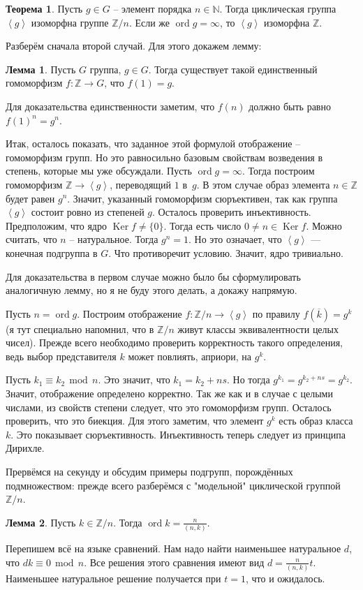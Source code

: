 \documentclass[10pt,a4paper,oneside]{book}
\theoremstyle{definition}
\newtheorem{thm}{\color{red!40!black}Теорема}
\newtheorem{lem}{\color{green!50!black}Лемма}
\renewcommand{\mod}{\,\operatorname{mod}\,}
\newcommand{\mb}[1]{\mathbb{#1}}
\newcommand{\ovl}{\overline}
\DeclareMathOperator{\Ker}{Ker}
\newcommand{\ord}{\operatorname{ord}}
\def\lan{\left\langle }
\def\ran{\right\rangle}
\def\thrm{\begin{thm}}
\def\ethrm{\end{thm}}
\def\lm{\begin{lem}}
\def\elm{\end{lem}}
\begin{document}
\thrm Пусть $g\in G$ -- элемент порядка $n\in \mb N$. Тогда циклическая группа $\lan g \ran $ изоморфна группе $\mb Z/n$. Если же $\ord g = \infty$, то $\lan g \ran$ изоморфна $\mb Z$.
\ethrm
{} Разберём сначала второй случай. Для этого докажем лемму: 
\lm Пусть $G$ группа, $g\in G$. Тогда существует такой единственный гомоморфизм $f \colon \mb Z \to G$, что $f(1)=g$.
\elm
\proof Для доказательства единственности заметим, что $f(n)$ должно быть равно $f(1)^n=g^n$. 

Итак, осталось показать, что заданное этой формулой отображение --  гомоморфизм групп. Но это равносильно базовым свойствам возведения в степень, которые мы уже обсуждали.
\endproof
{}
Пусть $\ord g=\infty$. Тогда построим гомоморфизм $\mb Z \to \lan g \ran$, переводящий $1$ в~$g$. В этом случае образ элемента $n \in \mb Z$ будет равен $g^n$. Значит, указанный гомоморфизм сюръективен, так как группа $\lan g \ran$ состоит ровно из степеней $g$. Осталось проверить инъективность. Предположим, что ядро $\Ker f \neq \{0\}$. Тогда есть число $0\neq n \in\Ker f $. Можно считать, что $n$ -- натуральное. Тогда $g^n=1$. Но это означает, что $\lan g \ran$ --- конечная подгруппа в $G$. Что противоречит условию. Значит, ядро тривиально.


Для доказательства в первом случае можно было бы сформулировать аналогичную лемму, но я не буду этого делать, а докажу напрямую.

Пусть $n=\ord g$. Построим отображение $f \colon\mb Z/n \to \lan g\ran $ по правилу $f(\ovl{k})=g^k$ (я тут специально напомнил, что в $\mb Z/n$ живут классы эквивалентности целых чисел).  Прежде всего необходимо проверить корректность такого определения, ведь выбор представителя $k$ может повлиять, априори, на $g^k$. 

Пусть $k_1\equiv k_2 \mod n$. Это значит, что $k_1=k_2+ns$. Но тогда $g^{k_1}=g^{k_2+ns}=g^{k_2}$. Значит, отображение определено корректно. Так же как и в случае с целыми числами, из свойств степени следует, что это гомоморфизм групп.   Осталось проверить, что это биекция. Для этого заметим, что элемент $g^k$ есть образ класса $k$. Это показывает сюръективность. Инъективность теперь следует из принципа Дирихле.
\endproof

Прервёмся на секунду и обсудим примеры подгрупп, порождённых подмножеством: прежде всего разберёмся с "модельной" циклической группой $\mb Z/n$.

\lm Пусть $k\in \mb Z/n$. Тогда $\ord k = \frac{n}{(n,k)}$. 
\elm
\proof Перепишем всё на языке сравнений. Нам надо найти наименьшее натуральное $d$, что $dk\equiv 0 \mod n$. Все решения этого сравнения имеют вид $d=\frac{n}{(n,k)}t$. Наименьшее натуральное решение получается при $t=1$, что и ожидалось.
\endproof
\end{document}

